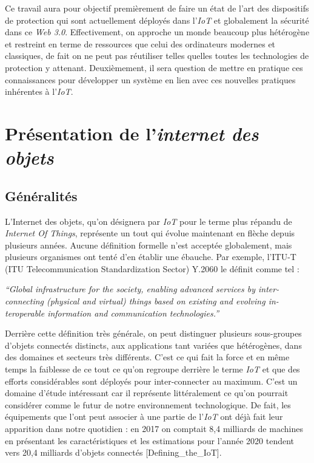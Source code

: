 \documentclass[]{article}
\begin{document}
\par Ce travail aura pour objectif premièrement de faire un état de l'art des dispositifs de protection qui sont actuellement déployés dans l'\textit{IoT} et globalement la sécurité dans ce \textit{Web 3.0}. Effectivement, on approche un monde beaucoup plus hétérogène et restreint en terme de ressources que celui des ordinateurs modernes et classiques, de fait on ne peut pas réutiliser telles quelles toutes les technologies de protection y attenant. Deuxièmement, il sera question de mettre en pratique ces connaissances pour développer un système en lien avec ces nouvelles pratiques inhérentes à l'\textit{IoT}.

\newpage
\section{Présentation de l'\textit{internet des objets}}

\subsection{Généralités}

\par L'Internet des objets, qu'on désignera par \textit{IoT} pour le terme plus répandu de \textit{Internet Of Things}, représente un tout qui évolue maintenant en flèche depuis plusieurs années. Aucune définition formelle n'est acceptée globalement, mais plusieurs organismes ont tenté d'en établir une ébauche. Par exemple, l'ITU-T (ITU Telecommunication Standardization Sector) Y.2060 le définit comme tel : 
\begin{center}
\textit{“Global  infrastructure  for  the  society,  enabling  advanced  services  by  inter-connecting (physical and virtual) things based on existing and evolving in-teroperable information and communication technologies.”}
\end{center}

\par Derrière cette définition très générale, on peut distinguer plusieurs sous-groupes d'objets connectés distincts, aux applications tant variées que hétérogènes, dans des domaines et secteurs très différents. C'est ce qui fait la force et en même temps la faiblesse de ce tout ce qu'on regroupe derrière le terme \textit{IoT} et que des efforts considérables sont déployés pour inter-connecter au maximum. C'est un domaine d'étude intéressant car il représente littéralement ce qu'on pourrait considérer comme le futur de notre environnement technologique. De fait, les équipements que l'ont peut associer à une partie de l'\textit{IoT} ont déjà fait leur apparition dans notre quotidien : en 2017 on comptait 8,4 milliards de machines en présentant les caractéristiques et les estimations pour l'année 2020 tendent vers 20,4 milliards d'objets connectés [Defining\_the\_IoT].  
\end{document}
